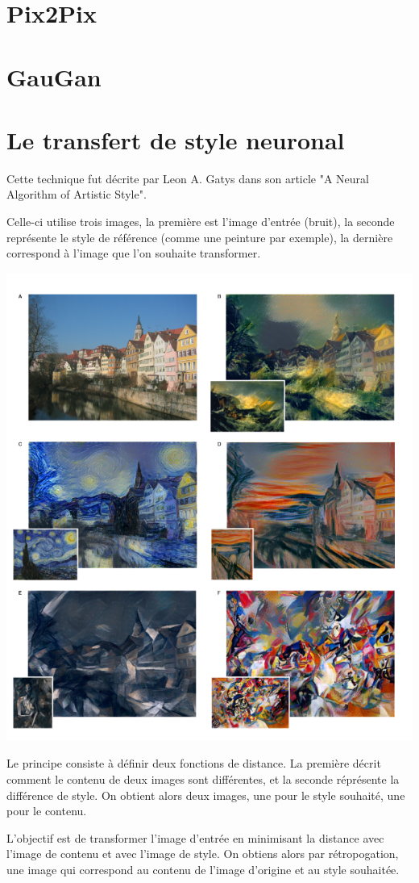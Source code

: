 \documentclass[a4paper, 12pt]{book}
\begin{document}
\section{Pix2Pix}

\section{GauGan}


\section{Le transfert de style neuronal}

Cette technique fut décrite par Leon A. Gatys dans son article "A Neural Algorithm of Artistic Style".~\cite{DBLP:journals/corr/GatysEB15a}

Celle-ci utilise trois images, la première est l'image d'entrée (bruit), la seconde représente le style de référence (comme une peinture par exemple), la dernière correspond à l'image que l'on souhaite transformer.

\includegraphics[width=0.7\linewidth]{images/neuronal-algorithm-artistic-style.png}

Le principe consiste à définir deux fonctions de distance. La première décrit comment le contenu de deux images sont différentes, et la seconde réprésente la différence de style. On obtient alors deux images, une pour le style souhaité, une pour le contenu.

L'objectif est de transformer l'image d'entrée en minimisant la distance avec l'image de contenu et avec l'image de style. On obtiens alors par rétropogation, une image qui correspond au contenu de l'image d'origine et au style souhaitée.
\end{document}
